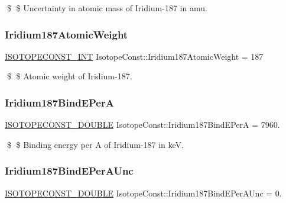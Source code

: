 \$ \$ Uncertainty in atomic mass of Iridium-\/187 in amu. \mbox{\label{group___isotope_const-_iridium-_ir187_ga04c1d97bb50e2e372bbee4213af6df13}} 
\subsubsection{\texorpdfstring{Iridium187\+Atomic\+Weight}{Iridium187AtomicWeight}}
{\footnotesize\ttfamily \mbox{\hyperlink{group___isotope_const-_macros_ga5f18360b3e99483a35c32d789e62621c}{I\+S\+O\+T\+O\+P\+E\+C\+O\+N\+S\+T\+\_\+\+I\+NT}} Isotope\+Const\+::\+Iridium187\+Atomic\+Weight = 187}

\$ \$ Atomic weight of Iridium-\/187. \mbox{\label{group___isotope_const-_iridium-_ir187_ga7f028dda2ac86e88fcd4c876a1d17807}} 
\subsubsection{\texorpdfstring{Iridium187\+Bind\+E\+PerA}{Iridium187BindEPerA}}
{\footnotesize\ttfamily \mbox{\hyperlink{group___isotope_const-_macros_ga8f45a7272ce02c0b4c65c44636ed719a}{I\+S\+O\+T\+O\+P\+E\+C\+O\+N\+S\+T\+\_\+\+D\+O\+U\+B\+LE}} Isotope\+Const\+::\+Iridium187\+Bind\+E\+PerA = 7960.}

\$ \$ Binding energy per A of Iridium-\/187 in keV. \mbox{\label{group___isotope_const-_iridium-_ir187_ga671e381e6967e9262920fefdcfaccc9b}} 
\subsubsection{\texorpdfstring{Iridium187\+Bind\+E\+Per\+A\+Unc}{Iridium187BindEPerAUnc}}
{\footnotesize\ttfamily \mbox{\hyperlink{group___isotope_const-_macros_ga8f45a7272ce02c0b4c65c44636ed719a}{I\+S\+O\+T\+O\+P\+E\+C\+O\+N\+S\+T\+\_\+\+D\+O\+U\+B\+LE}} Isotope\+Const\+::\+Iridium187\+Bind\+E\+Per\+A\+Unc = 0.}

